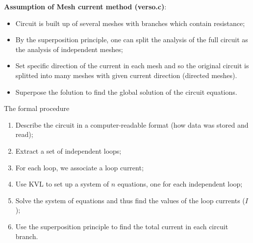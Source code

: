 \documentclass[xcolor=dvipsnames]{beamer}
\begin{document}
\begin{frame}
\textbf{Assumption of Mesh current method (verso.c)}:
\begin{itemize}
	\item Circuit is built up of several meshes with branches which contain resistance;
	\item By the superposition principle, one can split the analysis of the full circuit as the analysis of independent meshes;
	\item Set specific direction of the current in each mesh and so the original circuit is splitted into many meshes with given current direction (directed meshes).
	\item Superpose the folution to find the global solution of the circuit equations.
\end{itemize}

\end{frame}


\begin{frame}{The formal procedure}
\begin{enumerate}
	\item Describe the circuit in a computer-readable format (how data was stored and read);
	\item Extract a set of independent loops;
	\item For each loop, we associate a loop current;
	\item Use KVL to set up a system of $n$ equations, one for each independent loop;
	\item Solve the system of equations and thus find the values of the loop currents ($I$);
	\item Use the superposition principle to find the total current in each circuit branch.
\end{enumerate}
\end{frame}
\end{document}
